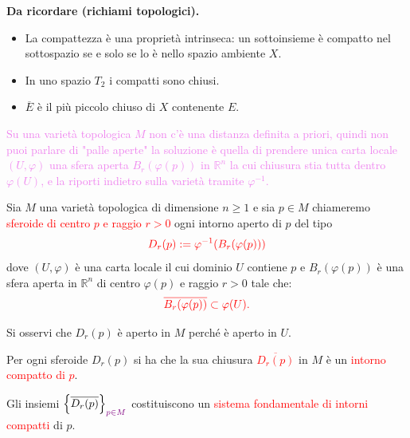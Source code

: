 \begin{richiamo}
        \textbf{Da ricordare (richiami topologici).}
        \begin{itemize}
        \item La compattezza è una proprietà intrinseca: un sottoinsieme è compatto nel sottospazio se e solo se lo è nello spazio ambiente $X$.
        \item In uno spazio $T_2$ i compatti sono chiusi.
        \item $\overline{E}$ è il più piccolo chiuso di $X$ contenente $E$.
        \end{itemize}
        \end{richiamo}

        \textcolor{violet}{Su una varietà topologica $M$ non c'è una distanza definita a priori, quindi non puoi parlare di "palle aperte" 
        la soluzione è quella di prendere unica carta locale  $(U, \varphi)$ una sfera aperta $B_r(\varphi(p))$ in $\mathbb{R}^n$ la cui 
        chiusura stia tutta dentro $\varphi(U)$, e la riporti indietro sulla varietà tramite $\varphi^{-1}$.}
        \begin{definizione}
        \label{def:sferoide}
        \mbox{}

        Sia $M$ una varietà topologica di dimensione $n \geq 1$ e sia $p \in M$ chiameremo \textcolor{red}{sferoide di centro $p$ e raggio $r > 0$} ogni 
        intorno aperto di $p$ del tipo
        \begin{equation}
        \label{eq:sferoide}
        \textcolor{red}{D_r(p) := \varphi^{-1}(B_r(\varphi(p)))}
        \end{equation}
        dove $(U, \varphi)$ è una carta locale il cui dominio $U$ contiene $p$ e $B_r(\varphi(p))$ è una sfera aperta in $\mathbb{R}^n$ di centro $\varphi(p)$ e raggio $r > 0$ tale che:
        \[
        \color{red} \overline{B_r(\varphi(p))} \subset \varphi(U).
        \]
        \end{definizione}

        Si osservi che $D_r(p)$ è aperto in $M$ perché è aperto in $U$.

        \begin{proposizione}
        \label{prop:chiusura_sferoide_intorno_compatto}
        \mbox{}

        Per ogni sferoide $D_r(p)$ si ha che la sua chiusura \textcolor{red}{$\overline{D_r(p)}$} in $M$ è un \textcolor{red}{intorno compatto di $p$}. 
        
        Gli insiemi \textcolor{red}{$\left\{\overline{D_r (p)}\right\}_{\textcolor{violet}{p \in M}}$} costituiscono un 
        \textcolor{red}{sistema fondamentale di intorni compatti} di $p$.
        \end{proposizione}

